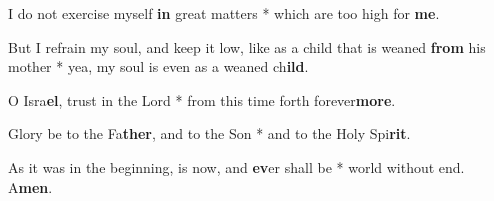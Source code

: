 \begin{multicols}{2}
	I do not exercise myself \textbf{in} great matters * which are too high for \textbf{me}.
	
	But I refrain my soul, and keep it low, like as a child that is weaned \textbf{from} his mother * yea, my soul is even as a weaned ch\textbf{ild}.
	
	O Isra\textbf{el}, trust in the Lord * from this time forth forever\textbf{more}.
	
	Glory be to the Fa\textbf{ther}, and to the Son * and to the Holy Spi\textbf{rit}.
	
	As it was in the beginning, is now, and \textbf{ev}er shall be * world without end. A\textbf{men}.
\end{multicols}